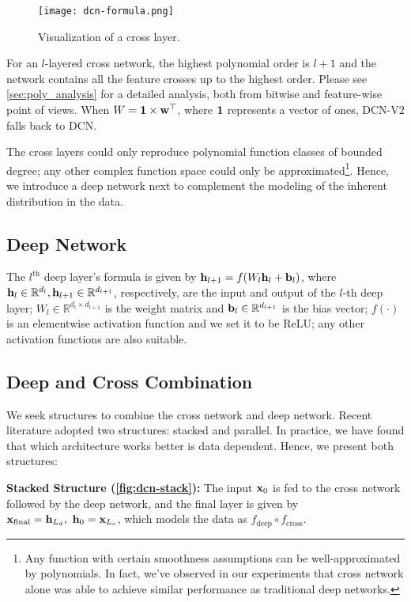 \documentclass[sigconf]{acmart}
\newcommand{\vecx}{{\bf x}}
\newcommand{\vecw}{{\bf w}}
\newcommand{\vecb}{{\bf b}}
\newcommand{\vech}{{\bf h}}
\begin{document}
\begin{figure}[htbp]
  \centering
  \texttt{[image: dcn-formula.png]}
\vspace{-2ex}
\caption{Visualization of a cross layer.}
  \label{fig:cross_sub_network}
\vspace{-1ex}
\end{figure}

For an $l$-layered cross network, the highest polynomial order is $l+1$ and the network contains all the feature crosses up to the highest order. Please see \autoref{sec:poly_analysis} for a detailed analysis, both from bitwise and feature-wise point of views. When $W = {\bf 1} \times \vecw^\top$, where ${\bf 1}$ represents a vector of ones, {DCN-V2} falls back to {DCN}.

The cross layers could only reproduce polynomial function classes of bounded degree; any other complex function space could only be approximated\footnote{Any function with certain smoothness assumptions can be well-approximated by polynomials. In fact, we've observed in our experiments that cross network alone was able to achieve similar performance as traditional deep networks.}. Hence, we introduce a deep network next to complement the modeling of the inherent distribution in the data.


\subsection{Deep Network}
The $l^\text{th}$ deep layer's formula is given by
$\vech_{l+1} = f(W_l \vech_l +  \vecb_l)$,
where $\vech_l \in \mathbb{R}^{d_l}, \vech_{l+1} \in \mathbb{R}^{d_{l+1}}$, respectively, are the input and output of the $l$-th deep layer; $W_{l} \in \mathbb{R}^{d_{l} \times d_{l+1}}$ is the weight matrix and $\vecb_l \in \mathbb{R}^{d_{l+1}}$ is the bias vector; $f(\cdot)$ is an elementwise activation function and we set it to be ReLU; any other activation functions are also suitable.

\subsection{Deep and Cross Combination}
We seek structures to combine the cross network and deep network. Recent literature adopted two structures: stacked and parallel. In practice, we have found that which architecture works better is data dependent. Hence, we present both structures:

{\bf Stacked Structure (\autoref{fig:dcn-stack}):} The input $\vecx_0$ is fed to the cross network followed by the deep network, and the final layer is given by $\vecx_{\text{final}} = \vech_{L_d}, ~ \vech_{0} = \vecx_{L_c}$, which models the data as $f_{\text{deep}} \circ f_{\text{cross}}$.
\end{document}
